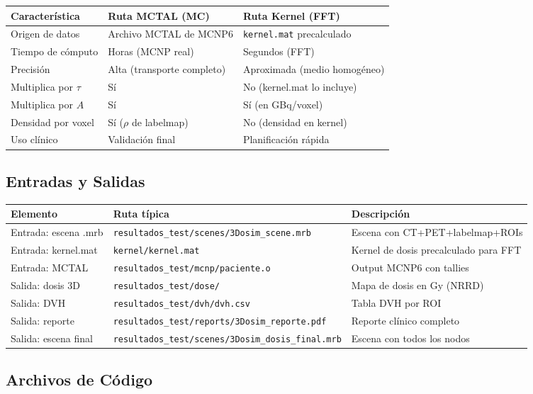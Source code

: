 \documentclass[12pt,a4paper]{article}
\begin{document}
\begin{tabular}{p{4cm} p{5cm} p{5cm}}
\toprule
\textbf{Característica} & \textbf{Ruta MCTAL (MC)} & \textbf{Ruta Kernel (FFT)} \\
\midrule
Origen de datos & Archivo MCTAL de MCNP6 & \texttt{kernel.mat} precalculado \\
Tiempo de cómputo & Horas (MCNP real) & Segundos (FFT) \\
Precisión & Alta (transporte completo) & Aproximada (medio homogéneo) \\
Multiplica por $\tau$ & Sí & No (kernel.mat lo incluye) \\
Multiplica por $A$ & Sí & Sí (en GBq/voxel) \\
Densidad por voxel & Sí ($\rho$ de labelmap) & No (densidad en kernel) \\
Uso clínico & Validación final & Planificación rápida \\
\bottomrule
\end{tabular}

\subsection{Entradas y Salidas}

\begin{tabular}{p{4cm} p{5cm} p{5cm}}
\toprule
\textbf{Elemento} & \textbf{Ruta típica} & \textbf{Descripción} \\
\midrule
Entrada: escena .mrb & \texttt{resultados\_test/scenes/3Dosim\_scene.mrb} & Escena con CT+PET+labelmap+ROIs \\
Entrada: kernel.mat & \texttt{kernel/kernel.mat} & Kernel de dosis precalculado para FFT \\
Entrada: MCTAL & \texttt{resultados\_test/mcnp/paciente.o} & Output MCNP6 con tallies \\
Salida: dosis 3D & \texttt{resultados\_test/dose/} & Mapa de dosis en Gy (NRRD) \\
Salida: DVH & \texttt{resultados\_test/dvh/dvh.csv} & Tabla DVH por ROI \\
Salida: reporte & \texttt{resultados\_test/reports/3Dosim\_reporte.pdf} & Reporte clínico completo \\
Salida: escena final & \texttt{resultados\_test/scenes/3Dosim\_dosis\_final.mrb} & Escena con todos los nodos \\
\bottomrule
\end{tabular}

\subsection*{Archivos de Código}
\end{document}
